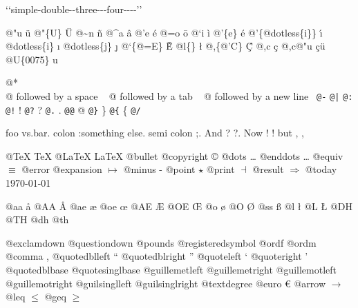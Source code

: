\documentclass{book}
\begin{document}
`\hbox{}`simple-double-\hbox{}-three{-}{-}{-}four{-}{-}{-}-'\hbox{}'\leavevmode{}\\

%
%
%
%

@"u \"{u} 
@"\{U\} \"{U} 
@\~{}n \~{n}
@\^{}a \^{a}
@'e \'{e}
@=o \={o}
@`i \`{i}
@'\{e\} \'{e}
@'\{@dotless\{i\}\} \'{\i{}} 
@dotless\{i\} \i{}
@dotless\{j\} \j{}
@`\{@=E\} \`{\={E}} 
@l\{\} \l{}
@,\{@'C\} \c{\'{C}}
@,c \c{c}
@,c@"u \c{c}\"{u} \leavevmode{}\\

@U\{0075\} u

@* \leavevmode{}\\
@ followed by a space
\ {}
@ followed by a tab
\ {}
@ followed by a new line
\ {}\texttt{@-} \-{}
\texttt{@|} 
\texttt{@:} \@
\texttt{@!} \@!
\texttt{@?} \@?
\texttt{@.} \@.
\texttt{@@} @
\texttt{@\}} \}
\texttt{@\{} \{
\texttt{@/} 

foo vs.\@ bar. 
colon :\@And something else.
semi colon ;\@.
And ? ?\@.
Now ! !\@@
but , ,\@

@TeX \TeX{}
@LaTeX \LaTeX{}
@bullet \textbullet{}
@copyright \copyright{}
@dots \dots{}\@
@enddots \dots{}
@equiv $\equiv{}$
@error 
@expansion $\mapsto{}$
@minus -
@point $\star{}$
@print $\dashv{}$
@result $\Rightarrow{}$
@today \today{}

@aa \aa{}
@AA \AA{}
@ae \ae{}
@oe \oe{}
@AE \AE{}
@OE \OE{}
@o \o{}
@O \O{}
@ss \ss{}
@l \l{}
@L \L{}
@DH \DH{}
@TH \TH{}
@dh \dh{}
@th \th{}

@exclamdown \textexclamdown{}
@questiondown \textquestiondown{}
@pounds \textsterling{}
@registeredsymbol \circledR{}
@ordf \textordfeminine{}
@ordm \textordmasculine{}
@comma ,
@quotedblleft \textquotedblleft{}
@quotedblright \textquotedblright{}
@quoteleft \textquoteleft{}
@quoteright \textquoteright{}
@quotedblbase \quotedblbase{}
@quotesinglbase \quotesinglbase{}
@guillemetleft \guillemotleft{}
@guillemetright \guillemotright{}
@guillemotleft \guillemotleft{}
@guillemotright \guillemotright{}
@guilsinglleft \guilsinglleft{}
@guilsinglright \guilsinglright{}
@textdegree \textdegree{}
@euro \euro{}
@arrow $\rightarrow{}$
@leq $\leq{}$
@geq $\geq{}$
\end{document}
